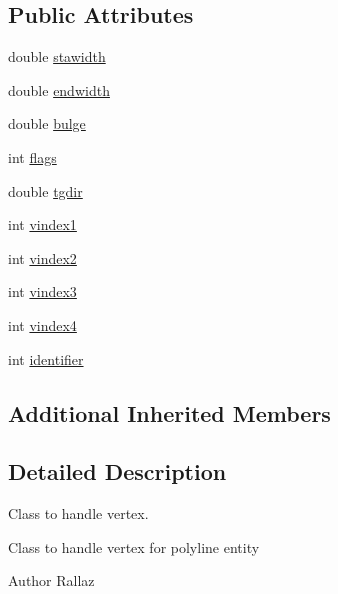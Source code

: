 \subsection*{Public Attributes}
\begin{DoxyCompactItemize}
\item 
double \hyperlink{classDRW__Vertex_a59c2c6a18ec24afdec344b187cb89e02}{stawidth}
\item 
double \hyperlink{classDRW__Vertex_a707f8fca7c9df740d9a13b1328c05d06}{endwidth}
\item 
double \hyperlink{classDRW__Vertex_ace756c96a4ff61eb15e7e1327d7fc56d}{bulge}
\item 
int \hyperlink{classDRW__Vertex_a662134a0aaac672cbb37c741e872ce3a}{flags}
\item 
double \hyperlink{classDRW__Vertex_ab94318addec1b5ca507a11cf8dd04b34}{tgdir}
\item 
int \hyperlink{classDRW__Vertex_aff58612a8e14eb93c6c7667fa19f087b}{vindex1}
\item 
int \hyperlink{classDRW__Vertex_a48f459a7d3627c898fa9e1be5b0de6d6}{vindex2}
\item 
int \hyperlink{classDRW__Vertex_a43d78abe4c3bacad98ef2a65216e225e}{vindex3}
\item 
int \hyperlink{classDRW__Vertex_a1f2c2a799721fe8e6290c6121c190ad8}{vindex4}
\item 
int \hyperlink{classDRW__Vertex_a14a4b517273a6c76a5b905eb691d5193}{identifier}
\end{DoxyCompactItemize}
\subsection*{Additional Inherited Members}


\subsection{Detailed Description}
Class to handle vertex. 

Class to handle vertex for polyline entity \begin{DoxyAuthor}{Author}
Rallaz 
\end{DoxyAuthor}


